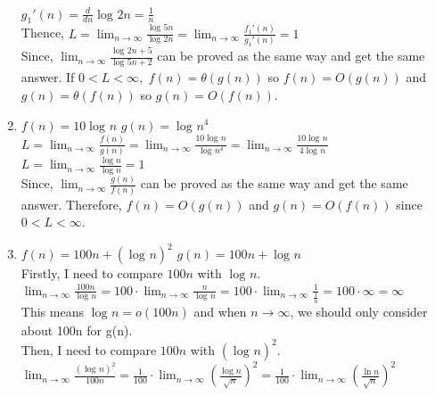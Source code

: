 \documentclass[12pt]{article}
\begin{document}
\begin{enumerate}[label=(\alph*)]
    $g_1'(n) = \frac{d}{dn}\log_{}{2n} = \frac{1}{n}$ \vspace{1mm} \\
    Thence, $L = \lim_{n\to\infty} \frac{\log_{}{5n}}{\log_{}{2n}} = \lim_{n\to\infty} \frac{f_1'(n)}{g_1'(n)} = 1$ \vspace{1mm} \\
    Since, $\lim_{n\to\infty} \frac{\log_{}{2n + 5}}{\log_{}{5n + 2}}$ can be proved as the same way and get the same answer.
    If $0 < L < \infty,$ $f(n) = \theta(g(n))$ so $f(n) = O(g(n)) $ and $ g(n) = \theta(f(n))$ so $g(n) = O(f(n)) $.
  \item $f(n) = 10\log_{}{n}$ \hspace{1cm} $g(n) = \log_{}{n^4}$ \vspace{1mm} \\
    $L = \lim_{n\to\infty} \frac{f(n)}{g(n)} = \lim_{n\to\infty} \frac{10\log_{}{n}}{\log_{}{n^4}} = \lim_{n\to\infty} \frac{10\log_{}{n}}{4\log_{}{n}} $ \vspace{1mm} \\
    $L = \lim_{n\to\infty} \frac{\log{}{n}}{\log{}{n}} = 1 $\vspace{2mm} \vspace{1mm} \\
    Since, $\lim_{n\to\infty} \frac{g(n)}{f(n)}$ can be proved as the same way and get the same answer. Therefore, $f(n) = O(g(n)) $ and $g(n) = O(f(n)) $ since $0 < L < \infty$. 
  \item $f(n) = 100n + (\log_{}{n})^2$ \hspace{1cm} $g(n) = 100n + \log_{}{n}$ \vspace{1mm} \\
    Firstly, I need to compare $100n$ with $\log_{}{n}$. \vspace{1mm} \\
    $\lim_{n\to\infty} \frac{100n}{\log_{}{n}} = 100\cdot\lim_{n\to\infty} \frac{n}{\log_{}{n}} = 100\cdot\lim_{n\to\infty} \frac{1}{\frac{1}{n}} = 100\cdot\infty = \infty$ \vspace{1mm} \\
    This means $\log_{}{n} = o(100n)$ and when $n\rightarrow\infty$, we should only consider about 100n for g(n). \vspace{1mm} \\
    Then, I need to compare $100n$ with $(\log_{}{n})^2$. \vspace{1mm} \\
    $\lim_{n\to\infty} \frac{(\log_{}{n})^2}{100n} = \frac{1}{100} \cdot \lim_{n\to\infty}(\frac{\log{}{n}}{\sqrt{n}})^2 = \frac{1}{100} \cdot \lim_{n\to\infty}(\frac{\ln{n}}{\sqrt{n}})^2$  \vspace{1mm} \\

\end{enumerate}
\end{document}

